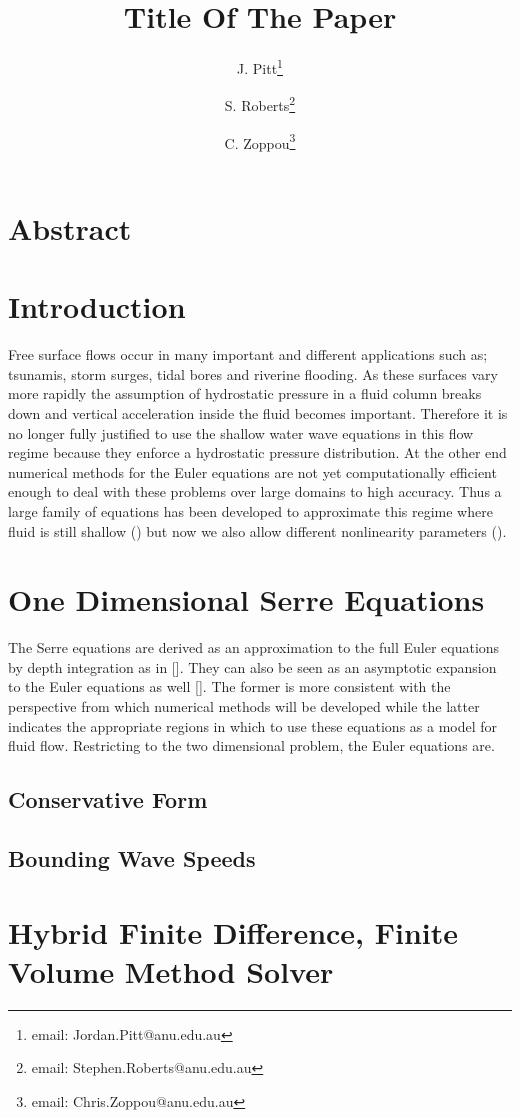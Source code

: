 \documentclass{article}
\title{Title Of The Paper}
\author[]{J. Pitt\thanks{email: Jordan.Pitt@anu.edu.au}}
\author[]{S. Roberts\thanks{email: Stephen.Roberts@anu.edu.au}}
\author[]{C. Zoppou\thanks{email: Chris.Zoppou@anu.edu.au}}
\affil[]{Mathematics Science Institute, Australian National University, Canberra, ACT 2001, Australia.}
\begin{document}
  \maketitle
  \section{Abstract}
  \tableofcontents
  \linenumbers
  \section{Introduction}
Free surface flows occur in many important and different applications such as; tsunamis, storm surges, tidal bores and riverine flooding. As these surfaces vary more rapidly the assumption of hydrostatic pressure in a fluid column breaks down and vertical acceleration inside the fluid becomes important. Therefore it is no longer fully justified to use the shallow water wave equations in this flow regime because they enforce a hydrostatic pressure distribution. At the other end numerical methods for the Euler equations are not yet computationally efficient enough to deal with these problems over large domains to high accuracy. Thus a large family of equations has been developed to approximate this regime where fluid is still shallow () but now we also allow different nonlinearity parameters (). 
  \section{One Dimensional Serre Equations}
  The Serre equations are derived as an approximation to the full Euler equations by depth integration as in []. They can also be seen as an asymptotic expansion to the Euler equations as well []. The former is more consistent with the perspective from which numerical methods will be developed while the latter indicates the appropriate regions in which to use these equations as a model for fluid flow. Restricting to the two dimensional problem, the Euler equations are.        
  \subsection{Conservative Form}
  \subsection{Bounding Wave Speeds}
  \section{Hybrid Finite Difference, Finite Volume Method Solver}
\end{document}
